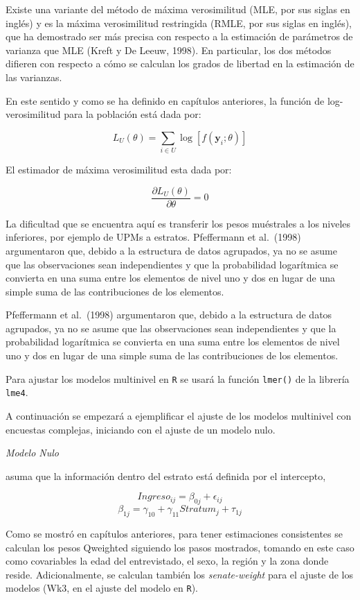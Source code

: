 \documentclass[
  12pt,
]{book}
\begin{document}
Existe una variante del método de máxima verosimilitud (MLE, por sus siglas en inglés) y es la máxima verosimilitud restringida (RMLE, por sus siglas en inglés), que ha demostrado ser más precisa con respecto a la estimación de parámetros de varianza que MLE (Kreft y De Leeuw, 1998). En particular, los dos métodos difieren con respecto a cómo se calculan los grados de libertad en la estimación de las varianzas.

En este sentido y como se ha definido en capítulos anteriores, la función de log-verosimilitud para la población está dada por:

\[
L_{U}\left(\theta\right)=\sum_{i\in U}\log\left[f\left(\boldsymbol{y}_{i};\theta\right)\right]
\]

El estimador de máxima verosimilitud esta dada por:

\[
\frac{\partial L_{U}\left(\theta\right)}{\partial\theta}=0
\]

La dificultad que se encuentra aquí es transferir los pesos muéstrales a los niveles inferiores, por ejemplo de UPMs a estratos. Pfeffermann et al.~(1998) argumentaron que, debido a la estructura de datos agrupados, ya no se asume que las observaciones sean independientes y que la probabilidad logarítmica se convierta en una suma entre los elementos de nivel uno y dos en lugar de una simple suma de las contribuciones de los elementos.

Pfeffermann et al.~(1998) argumentaron que, debido a la estructura de datos agrupados, ya no se asume que las observaciones sean independientes y que la probabilidad logarítmica se convierta en una suma entre los elementos de nivel uno y dos en lugar de una simple suma de las contribuciones de los elementos.

Para ajustar los modelos multinivel en \texttt{R} se usará la función \texttt{lmer()} de la librería \texttt{lme4}.

A continuación se empezará a ejemplificar el ajuste de los modelos multinivel con encuestas complejas, iniciando con el ajuste de un modelo nulo.

\emph{Modelo Nulo}

asuma que la información dentro del estrato está definida por el intercepto,

\[
Ingreso_{ij}=\beta_{0j}+\epsilon_{ij}
\]
\[
\beta_{1j} = \gamma_{10}+\gamma_{11}Stratum_{j} + \tau_{1j}
\]

Como se mostró en capítulos anteriores, para tener estimaciones consistentes se calculan los pesos Qweighted siguiendo los pasos mostrados, tomando en este caso como covariables la edad del entrevistado, el sexo, la región y la zona donde reside. Adicionalmente, se calculan también los \emph{senate-weight} para el ajuste de los modelos (Wk3, en el ajuste del modelo en \texttt{R}).
\end{document}

